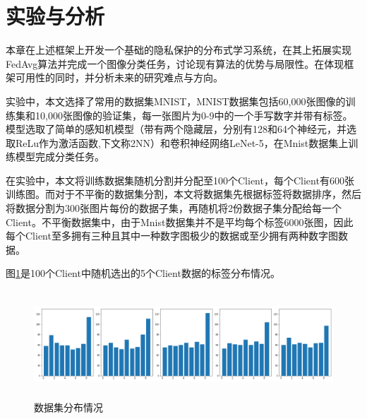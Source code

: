 \documentclass[zihao = -4,cn]{oucart}
\begin{document}
\section{实验与分析}
本章在上述框架上开发一个基础的隐私保护的分布式学习系统，在其上拓展实现FedAvg算法并完成一个图像分类任务，讨论现有算法的优势与局限性。在体现框架可用性的同时，并分析未来的研究难点与方向。\par
实验中，本文选择了常用的数据集MNIST，MNIST数据集包括60,000张图像的训练集和10,000张图像的验证集，每一张图片为0-9中的一个手写数字并带有标签。模型选取了简单的感知机模型（带有两个隐藏层，分别有128和64个神经元，并选取ReLu作为激活函数,下文称2NN）和卷积神经网络LeNet-5\cite{lecun2015lenet}，在Mnist数据集上训练模型完成分类任务。\par
在实验中，本文将训练数据集随机分割并分配至100个Client，每个Client有600张训练图。而对于不平衡的数据集分割，本文将数据集先根据标签将数据排序，然后将数据分割为300张图片每份的数据子集，再随机将2份数据子集分配给每一个Client。不平衡数据集中，由于Mnist数据集并不是平均每个标签6000张图，因此每个Client至多拥有三种且其中一种数字图极少的数据或至少拥有两种数字图数据。\par
图\ref{fig:random_data}是100个Client中随机选出的5个Client数据的标签分布情况。
\begin{figure}[h]
	\centering %
	\includegraphics[width=15cm,height=4cm]{assets/random_data}
	\caption{数据集分布情况}
	\label{fig:random_data}
\end{figure}
\end{document}
